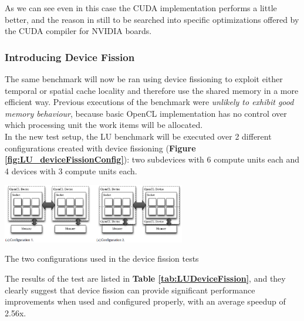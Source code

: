 As we can see even in this case the CUDA implementation performs a little better, and the reason in still to be searched into specific optimizations offered by the CUDA compiler for NVIDIA boards.

\subsubsection{Introducing Device Fission} \label{sect:LUDeviceFission}

The same benchmark will now be ran using device fissioning to exploit either temporal or spatial cache locality and therefore use the shared memory in a more efficient way. Previous executions of the benchmark were \emph{unlikely to exhibit good memory behaviour}, because basic OpenCL implementation has no control over which processing unit the work items will be allocated.\\
In the new test setup, the LU benchmark will be executed over 2 different configurations created with device fissioning (\textbf{Figure \ref{fig:LU_deviceFissionConfig}}): two subdevices with 6 compute units each and 4 devices with 3 compute units each.

\begin{figurehere}
 \centering
 \includegraphics[width=8cm]{./eps/LU_deviceFissionConfig.eps}
 \caption{The two configurations used in the device fission tests}
 \label{fig:LU_deviceFissionConfig}
\end{figurehere}

The results of the test are listed in \textbf{Table \ref{tab:LUDeviceFission}}, and they clearly suggest that device fission can provide significant performance improvements when used and configured properly, with an average speedup of 2.56x. \\

